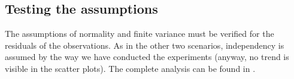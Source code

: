 \subsection{Testing the assumptions}\label{subsec:rectassumptions}

The assumptions of normality and finite variance must be verified for the
residuals of the observations. As in the other two scenarios, independency is
assumed by the way we have conducted the experiments (anyway, no trend is
visible in the scatter plots). The complete analysis can be found in
.



